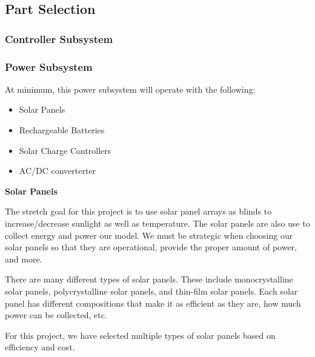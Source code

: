 \subsection{Part Selection}
\subsubsection{Controller Subsystem}
\subsubsection{Power Subsystem}

\begin{flushleft} 
	At minimum, this power subsystem will operate with the following:
	\begin{itemize}
		\item Solar Panels 
		\item Rechargeable Batteries 
		\item Solar Charge Controllers
		\item AC/DC converterter
	\end{itemize}
	\textbf{Solar Panels}\par
	The stretch goal for this project is to use solar panel arrays as blinds to increase/decrease sunlight as well as temperature. The solar panels are also use to collect energy and power our model. We must be strategic when choosing our solar panels so that they are operational, provide the proper amount of power, and more. \par
	There are many different types of solar panels. These include monocrystalline solar panels, polycrystalline solar panels, and thin-film solar panels. Each solar panel has different compositions that make it as efficient as they are, how much power can be collected, etc. \par
	For this project, we have selected multiple types of solar panels based on efficiency and cost.
\end{flushleft}
